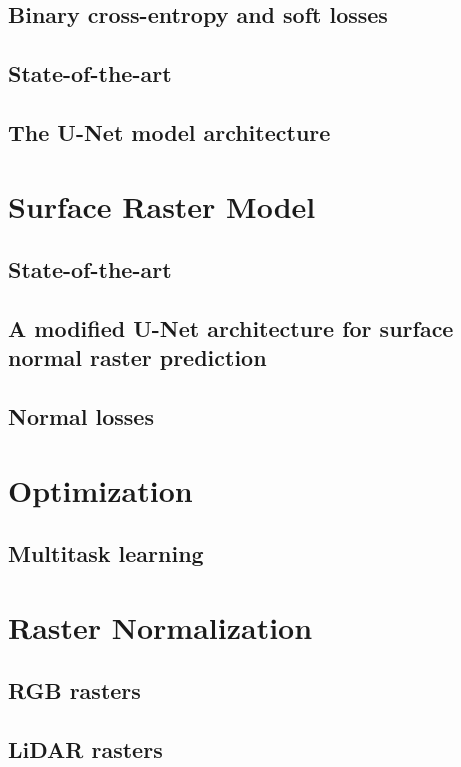 \subsection{Binary cross-entropy and soft losses}
\subsection{State-of-the-art}
\subsection{The U-Net model architecture}

\section{Surface Raster Model}
\subsection{State-of-the-art}
\subsection{A modified U-Net architecture for surface normal raster prediction}
\subsection{Normal losses}

\section{Optimization}
\subsection{Multitask learning}

\section{Raster Normalization}%
\label{sec:raster-normalization}

\subsection{RGB rasters}
\subsection{LiDAR rasters}
